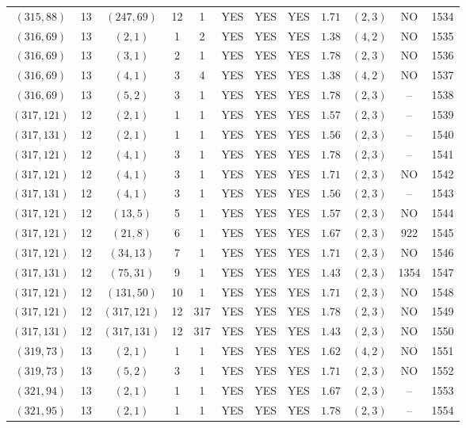 \begin{longtable}{|c|c|c|c|c|c|c|c|c|c|c|c|}
$(315,88)$ & 13 & $(247,69)$ & 12 & 1 & YES & YES & YES & $1.71$ & $(2,3)$ & NO & 1534\\
$(316,69)$ & 13 & $(2,1)$ & 1 & 2 & YES & YES & YES & $1.38$ & $(4,2)$ & NO & 1535\\
$(316,69)$ & 13 & $(3,1)$ & 2 & 1 & YES & YES & YES & $1.78$ & $(2,3)$ & NO & 1536\\
$(316,69)$ & 13 & $(4,1)$ & 3 & 4 & YES & YES & YES & $1.38$ & $(4,2)$ & NO & 1537\\
$(316,69)$ & 13 & $(5,2)$ & 3 & 1 & YES & YES & YES & $1.78$ & $(2,3)$ & -- & 1538\\
$(317,121)$ & 12 & $(2,1)$ & 1 & 1 & YES & YES & YES & $1.57$ & $(2,3)$ & -- & 1539\\
$(317,131)$ & 12 & $(2,1)$ & 1 & 1 & YES & YES & YES & $1.56$ & $(2,3)$ & -- & 1540\\
$(317,121)$ & 12 & $(4,1)$ & 3 & 1 & YES & YES & YES & $1.78$ & $(2,3)$ & -- & 1541\\
$(317,121)$ & 12 & $(4,1)$ & 3 & 1 & YES & YES & YES & $1.71$ & $(2,3)$ & NO & 1542\\
$(317,131)$ & 12 & $(4,1)$ & 3 & 1 & YES & YES & YES & $1.56$ & $(2,3)$ & -- & 1543\\
$(317,121)$ & 12 & $(13,5)$ & 5 & 1 & YES & YES & YES & $1.57$ & $(2,3)$ & NO & 1544\\
$(317,121)$ & 12 & $(21,8)$ & 6 & 1 & YES & YES & YES & $1.67$ & $(2,3)$ & 922 & 1545\\
$(317,121)$ & 12 & $(34,13)$ & 7 & 1 & YES & YES & YES & $1.71$ & $(2,3)$ & NO & 1546\\
$(317,131)$ & 12 & $(75,31)$ & 9 & 1 & YES & YES & YES & $1.43$ & $(2,3)$ & 1354 & 1547\\
$(317,121)$ & 12 & $(131,50)$ & 10 & 1 & YES & YES & YES & $1.71$ & $(2,3)$ & NO & 1548\\
$(317,121)$ & 12 & $(317,121)$ & 12 & 317 & YES & YES & YES & $1.78$ & $(2,3)$ & NO & 1549\\
$(317,131)$ & 12 & $(317,131)$ & 12 & 317 & YES & YES & YES & $1.43$ & $(2,3)$ & NO & 1550\\
$(319,73)$ & 13 & $(2,1)$ & 1 & 1 & YES & YES & YES & $1.62$ & $(4,2)$ & NO & 1551\\
$(319,73)$ & 13 & $(5,2)$ & 3 & 1 & YES & YES & YES & $1.71$ & $(2,3)$ & NO & 1552\\
$(321,94)$ & 13 & $(2,1)$ & 1 & 1 & YES & YES & YES & $1.67$ & $(2,3)$ & -- & 1553\\
$(321,95)$ & 13 & $(2,1)$ & 1 & 1 & YES & YES & YES & $1.78$ & $(2,3)$ & -- & 1554\\

\end{longtable}
